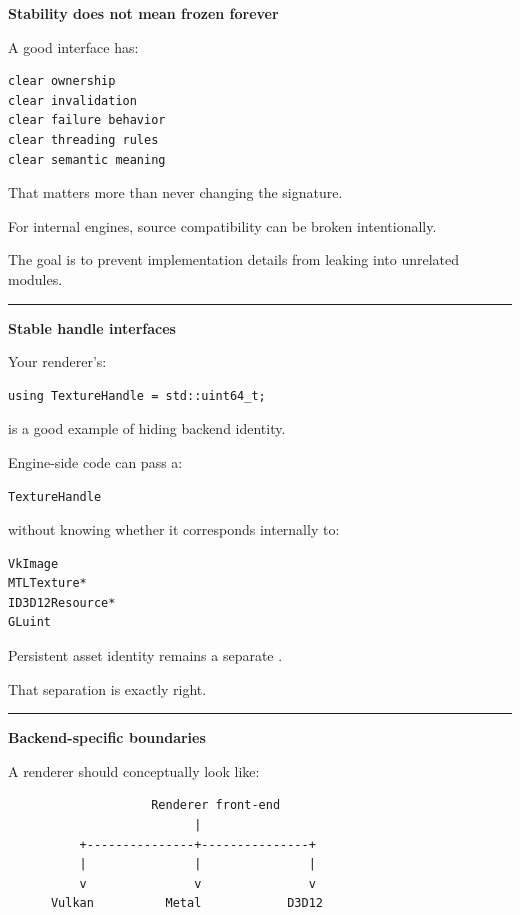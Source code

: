\textbf{Stability does not mean frozen forever}

A good interface has:

\begin{verbatim}
clear ownership
clear invalidation
clear failure behavior
clear threading rules
clear semantic meaning
\end{verbatim}

That matters more than never changing the signature.

For internal engines, source compatibility can be broken intentionally.

The goal is to prevent implementation details from leaking into unrelated modules.

\begin{center}\rule{0.5\linewidth}{0.5pt}\end{center}

\textbf{Stable handle interfaces}

Your renderer's:

\begin{verbatim}
using TextureHandle = std::uint64_t;
\end{verbatim}

is a good example of hiding backend identity.

Engine-side code can pass a:

\begin{verbatim}
TextureHandle
\end{verbatim}

without knowing whether it corresponds internally to:

\begin{verbatim}
VkImage
MTLTexture*
ID3D12Resource*
GLuint
\end{verbatim}

Persistent asset identity remains a separate .

That separation is exactly right.

\begin{center}\rule{0.5\linewidth}{0.5pt}\end{center}

\textbf{Backend-specific boundaries}

A renderer should conceptually look like:

\begin{verbatim}
                    Renderer front-end
                          |
          +---------------+---------------+
          |               |               |
          v               v               v
      Vulkan          Metal            D3D12
\end{verbatim}

